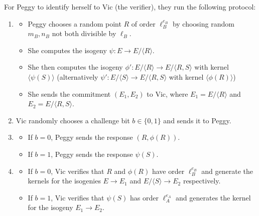 \documentclass{amsart}
\theoremstyle{plain}
\theoremstyle{remark}
\numberwithin{equation}{section}
\begin{document}
For Peggy to identify herself to Vic (the verifier), they run the following protocol:
\begin{enumerate}
	\item 
	\begin{itemize}
		\item Peggy chooses a random point $R$ of order $\ell_B^{e_B}$ by choosing random $m_B,n_B$ not both divisible by $\ell_B$.

		\item She computes the isogeny $\psi: E \to E/\langle R \rangle$. 

		\item She then computes the isogeny $\phi':E/\langle R \rangle \to E/\langle R,S\rangle$ with kernel $\langle\psi(S)\rangle$ (alternatively $\psi':E/\langle S \rangle \to E/\langle R,S\rangle$ with kernel $\langle\phi(R)\rangle$)

		\item She sends the commitment $(E_1,E_2)$ to Vic, where $E_1 = E/\langle R \rangle$ and $E_2 = E/\langle R,S\rangle$.
	\end{itemize}

	\vspace{2mm}

	\item
	Vic randomly chooses a challenge bit $b \in \{0,1\}$ and sends it to Peggy.

	\vspace{2mm}
	
	\item
	\begin{itemize}
		\item If $b=0$, Peggy sends the response $(R,\phi(R))$.
		\item If $b=1$, Peggy sends the response $\psi(S)$.
	\end{itemize}

	\vspace{2mm}
	
	\item
	\begin{itemize}
		\item If $b=0$, Vic verifies that $R$ and $\phi(R)$ have order $\ell_B^{e_B}$ and generate the kernels for the isogenies $E \to E_1$ and $E/\langle S \rangle \to E_2$ respectively.
		
		\item If $b=1$, Vic verifies that $\psi(S)$ has order $\ell_A^{e_A}$ and generates the kernel for the isogeny $E_1 \to E_2$.
	\end{itemize}
\end{enumerate}
\end{document}

